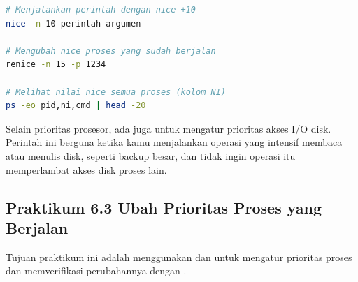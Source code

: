 \begin{lstlisting}[language=bash, caption={Sintaks nice dan renice}]
# Menjalankan perintah dengan nice +10
nice -n 10 perintah argumen

# Mengubah nice proses yang sudah berjalan
renice -n 15 -p 1234

# Melihat nilai nice semua proses (kolom NI)
ps -eo pid,ni,cmd | head -20
\end{lstlisting}

Selain prioritas prosesor, ada juga  untuk mengatur prioritas akses I/O disk.
Perintah ini berguna ketika kamu menjalankan operasi yang intensif membaca atau menulis
disk, seperti backup besar, dan tidak ingin operasi itu memperlambat akses disk proses lain.

\subsection*{Praktikum 6.3 Ubah Prioritas Proses yang Berjalan}

Tujuan praktikum ini adalah menggunakan  dan  untuk mengatur
prioritas proses dan memverifikasi perubahannya dengan .

